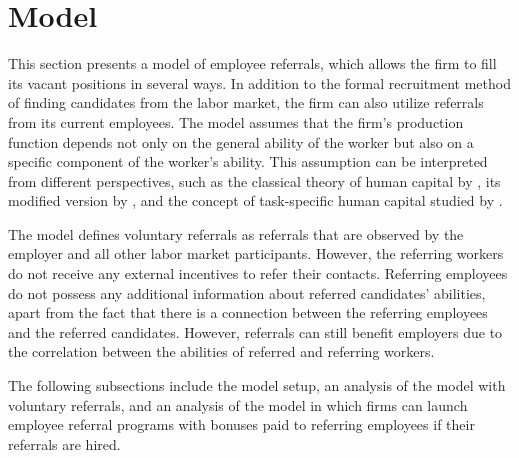 \documentclass[12pt]{article}
\begin{document}


\section{Model} \label{sec:model}
This section presents a model of employee referrals, which allows the firm to fill its vacant positions in several ways. In addition to the formal recruitment method of finding candidates from the labor market, the firm can also utilize referrals from its current employees. The model assumes that the firm's production function depends not only on the general ability of the worker but also on a specific component of the worker's ability. This assumption can be interpreted from different perspectives, such as the classical theory of human capital by \cite{becker1962investment}, its modified version by \cite{lazear2009firm}, and the concept of task-specific human capital studied by \cite{gibbons2004task}. 

The model defines voluntary referrals as referrals that are observed by the employer and all other labor market participants. However, the referring workers do not receive any external incentives to refer their contacts. Referring employees do not possess any additional information about referred candidates' abilities, apart from the fact that there is a connection between the referring employees and the referred candidates. However, referrals can still benefit employers due to the correlation between the abilities of referred and referring workers. 

The following subsections include the model setup, an analysis of the model with voluntary referrals, and an analysis of the model in which firms can launch employee referral programs with bonuses paid to referring employees if their referrals are hired.
\end{document}

